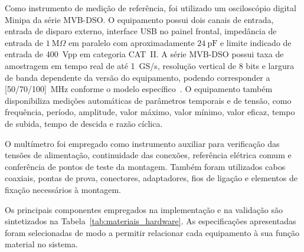 \documentclass[a4paper,12pt]{fcte}
\begin{document}
Como instrumento de medição de referência, foi utilizado um osciloscópio digital Minipa da série MVB-DSO. O equipamento possui dois canais de entrada, entrada de disparo externo, interface USB no painel frontal, impedância de entrada de $1~\text{M}\Omega$ em paralelo com aproximadamente $24~\text{pF}$ e limite indicado de entrada de 400~Vpp em categoria CAT~II. A série MVB-DSO possui taxa de amostragem em tempo real de até 1~GS/s, resolução vertical de 8 bits e largura de banda dependente da versão do equipamento, podendo corresponder a [50/70/100]~MHz conforme o modelo específico~\cite{minipa_mvb_dso_manual}. O equipamento também disponibiliza medições automáticas de parâmetros temporais e de tensão, como frequência, período, amplitude, valor máximo, valor mínimo, valor eficaz, tempo de subida, tempo de descida e razão cíclica.

O multímetro foi empregado como instrumento auxiliar para verificação das tensões de alimentação, continuidade das conexões, referência elétrica comum e conferência de pontos de teste da montagem. Também foram utilizados cabos coaxiais, pontas de prova, conectores, adaptadores, fios de ligação e elementos de fixação necessários à montagem.

Os principais componentes empregados na implementação e na validação são sintetizados na Tabela~\ref{tab:materiais_hardware}. As especificações apresentadas foram selecionadas de modo a permitir relacionar cada equipamento à sua função material no sistema.
\end{document}
